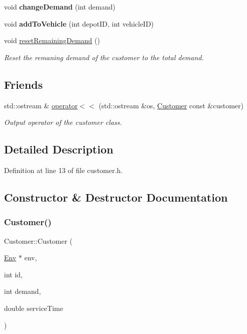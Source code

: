 \begin{DoxyCompactItemize}
void {\bfseries change\+Demand} (int demand)
\item 
\mbox{\label{class_customer_ace23d6d0c410c70f38bc99ac383201b5}} 
void {\bfseries add\+To\+Vehicle} (int depot\+ID, int vehicle\+ID)
\item 
\mbox{\label{class_customer_a0f06bdce903a3efcffe01008183b19bc}} 
void \hyperlink{class_customer_a0f06bdce903a3efcffe01008183b19bc}{reset\+Remaining\+Demand} ()
\begin{DoxyCompactList}\small\item\em Reset the remaning demand of the customer to the total demand. \end{DoxyCompactList}\end{DoxyCompactItemize}
\subsection*{Friends}
\begin{DoxyCompactItemize}
\item 
std\+::ostream \& \hyperlink{class_customer_a3d7eef7f15d078958c6bbd64019e20fa}{operator$<$$<$} (std\+::ostream \&os, \hyperlink{class_customer}{Customer} const \&customer)
\begin{DoxyCompactList}\small\item\em Output operator of the customer class. \end{DoxyCompactList}\end{DoxyCompactItemize}


\subsection{Detailed Description}


Definition at line 13 of file customer.\+h.



\subsection{Constructor \& Destructor Documentation}
\mbox{\label{class_customer_aaa83636312ec0431684c8d898a21ad69}} 
\subsubsection{\texorpdfstring{Customer()}{Customer()}}
{\footnotesize\ttfamily Customer\+::\+Customer (\begin{DoxyParamCaption}\item[{\hyperlink{class_env}{Env} $\ast$}]{env,  }\item[{int}]{id,  }\item[{int}]{demand,  }\item[{double}]{service\+Time }\end{DoxyParamCaption})}



